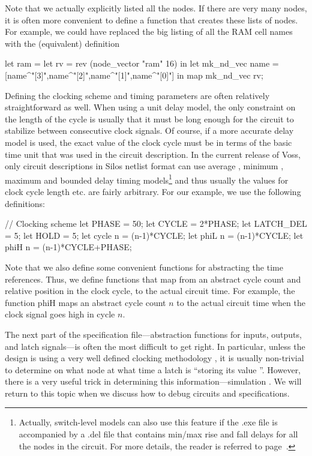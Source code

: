 Note that we actually explicitly listed all the nodes.
If there are very many nodes, it is often more convenient to define 
a function that creates these lists of nodes.
For example, we could have replaced the big listing of all the
RAM cell names with the (equivalent) definition
\begin{hol}
let ram =
        let rv = rev (node\_vector "ram" 16) in
        let mk\_nd\_vec name = [name^"[3]",name^"[2]",name^"[1]",name^"[0]"] in
        map mk\_nd\_vec rv;
\end{hol}

Defining the clocking scheme and timing parameters%
%
{} are often
relatively straightforward as well.
When using a unit delay%
%
{} model, the only constraint on the length
of the cycle is usually that it must be long enough for the circuit
to stabilize between consecutive clock signals.
Of course, if a more accurate delay model is used, the exact value
of the clock cycle must be in terms of the basic time unit%
%
{} that
was used in the circuit description.
In the current release of Voss, only circuit descriptions in Silos netlist
format can use average%
%
{}, minimum%
%
{}, maximum%
%
{} and bounded delay%
%
{} timing
models\footnote{Actually, switch-level models can also use this feature
if the .exe file is accompanied by a .del%
%
{} file that contains min/max rise
and fall delays for all the nodes in the circuit. For more details, the
reader is referred to page~\pageref{DelayAnnotation}.} and thus
usually the values for clock cycle length etc. are fairly arbitrary.
For our example, we use the following definitions:
\begin{hol}
// Clocking scheme
let PHASE     = 50;
let CYCLE     = 2*PHASE;
let LATCH\_DEL = 5;
let HOLD      = 5;
let cycle n   = (n-1)*CYCLE;
let phiL n    = (n-1)*CYCLE;
let phiH n    = (n-1)*CYCLE+PHASE;
\end{hol}
Note that we also define some convenient functions for abstracting
the time references.
Thus, we define functions that map from an abstract cycle count and
relative position in the clock cycle, to the actual circuit time.
For example, the function phiH maps an abstract cycle count $n$ to
the actual circuit time when the clock signal goes high
in cycle $n$.

The next part of the specification file---abstraction functions%
%
{}
for inputs, outputs, and latch signals---is often the most difficult to
get right.
In particular, unless the design is using a very well defined
clocking methodology%
%
{}, it is usually non-trivial to determine
on what node at what time a latch is ``storing its value%
%
{}''.
However, there is a very useful trick in determining this
information---simulation%
%
{}.
We will return to this topic when we discuss how to debug
circuits and specifications.

